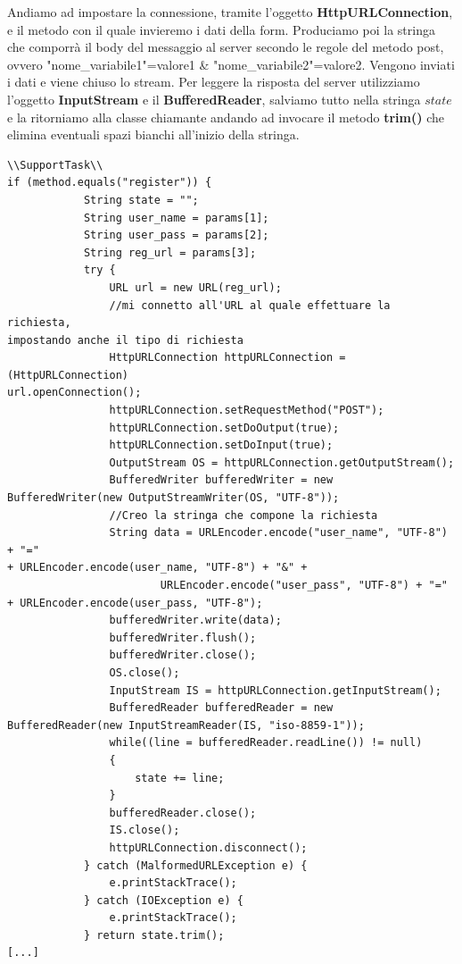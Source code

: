 \documentclass[a4paper, 50pt, twoside]{article}
\begin{document}
Andiamo ad impostare la connessione, tramite l'oggetto \textbf{HttpURLConnection}, e il metodo con il quale invieremo i dati della form. Produciamo poi la stringa che comporrà il body del messaggio al server secondo le regole del metodo post, ovvero "nome\_variabile1"=valore1 \&  "nome\_variabile2"=valore2. Vengono inviati i dati e viene chiuso lo stream. Per leggere la risposta del server utilizziamo l'oggetto \textbf{InputStream} e il \textbf{BufferedReader}, salviamo tutto nella stringa $state$ e la ritorniamo alla classe chiamante andando ad invocare il metodo \textbf{trim()} che elimina eventuali spazi bianchi all'inizio della stringa.
\begin{lstlisting}
\\SupportTask\\
if (method.equals("register")) {
            String state = "";
            String user_name = params[1];
            String user_pass = params[2];
            String reg_url = params[3];
            try {
                URL url = new URL(reg_url);
                //mi connetto all'URL al quale effettuare la richiesta, 
impostando anche il tipo di richiesta
                HttpURLConnection httpURLConnection = (HttpURLConnection) 
url.openConnection();
                httpURLConnection.setRequestMethod("POST");
                httpURLConnection.setDoOutput(true);
                httpURLConnection.setDoInput(true);
                OutputStream OS = httpURLConnection.getOutputStream();
                BufferedWriter bufferedWriter = new 
BufferedWriter(new OutputStreamWriter(OS, "UTF-8"));
                //Creo la stringa che compone la richiesta
                String data = URLEncoder.encode("user_name", "UTF-8") + "=" 
+ URLEncoder.encode(user_name, "UTF-8") + "&" +
                        URLEncoder.encode("user_pass", "UTF-8") + "=" 
+ URLEncoder.encode(user_pass, "UTF-8");
                bufferedWriter.write(data);
                bufferedWriter.flush();
                bufferedWriter.close();
                OS.close();
                InputStream IS = httpURLConnection.getInputStream();
                BufferedReader bufferedReader = new 
BufferedReader(new InputStreamReader(IS, "iso-8859-1"));
                while((line = bufferedReader.readLine()) != null)
                {
                    state += line;
                }
                bufferedReader.close();
                IS.close();
                httpURLConnection.disconnect();
            } catch (MalformedURLException e) {
                e.printStackTrace();
            } catch (IOException e) {
                e.printStackTrace();
            } return state.trim();
[...]
\end{lstlisting}
\end{document}
